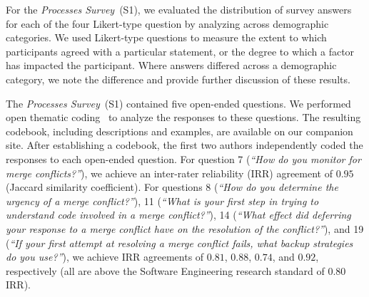 For the \textit{Processes Survey}~(S1), we evaluated the distribution of survey answers for each of the four Likert-type question by analyzing across demographic categories.
We used Likert-type questions to measure the extent to which participants agreed with a particular statement, or the degree to which a factor has impacted the participant.
Where answers differed across a demographic category, we note the difference and provide further discussion of these results.

The \textit{Processes Survey}~(S1) contained five open-ended questions.
We performed open thematic coding~\cite{fereday2006demonstrating} to analyze the responses to these questions.
The resulting codebook, including descriptions and examples, are available on our companion site.
After establishing a codebook, the first two authors independently coded the responses to each open-ended question.
For question 7 (\textit{``How do you monitor for merge conflicts?''}), we achieve an inter-rater reliability (IRR) agreement of $0.95$ (Jaccard similarity coefficient).
For questions 8 (\textit{``How do you determine the urgency of a merge conflict?''}), 11 (\textit{``What is your first step in trying to understand code involved in a merge conflict?''}), 14 (\textit{``What effect did deferring your response to a merge conflict have on the resolution of the conflict?''}), and 19 (\textit{``If your first attempt at resolving a merge conflict fails, what backup strategies do you use?''}), we achieve IRR agreements of $0.81$, $0.88$, $0.74$, and $0.92$, respectively (all are above the Software Engineering research standard of $0.80$ IRR).

